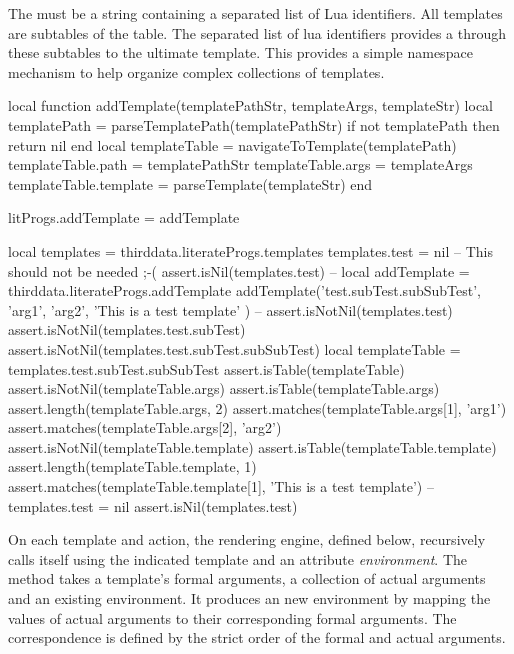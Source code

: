 {{The  must be a string containing a  separated 
list of Lua identifiers. All templates are subtables of the 
 table. The  separated 
list of lua identifiers provides a  through these subtables to 
the ultimate template. This provides a simple namespace mechanism to help 
organize complex collections of templates. 

\startLuaCode
local function addTemplate(templatePathStr, templateArgs, templateStr)
  local templatePath = parseTemplatePath(templatePathStr)
  if not templatePath then return nil end
  local templateTable    = navigateToTemplate(templatePath)
  templateTable.path     = templatePathStr
  templateTable.args     = templateArgs
  templateTable.template = parseTemplate(templateStr)
end

litProgs.addTemplate = addTemplate
\stopLuaCode

\startLuaTest
local templates = thirddata.literateProgs.templates
templates.test = nil -- This should not be needed ;-(
assert.isNil(templates.test)
--
local addTemplate = thirddata.literateProgs.addTemplate
addTemplate('test.subTest.subSubTest',
  { 'arg1', 'arg2'},
  'This is a test template'
)
--
assert.isNotNil(templates.test)
assert.isNotNil(templates.test.subTest)
assert.isNotNil(templates.test.subTest.subSubTest)
local templateTable = templates.test.subTest.subSubTest
assert.isTable(templateTable)
assert.isNotNil(templateTable.args)
assert.isTable(templateTable.args)
assert.length(templateTable.args, 2)
assert.matches(templateTable.args[1], 'arg1')
assert.matches(templateTable.args[2], 'arg2')
assert.isNotNil(templateTable.template)
assert.isTable(templateTable.template)
assert.length(templateTable.template, 1)
assert.matches(templateTable.template[1], 'This is a test template')
--
templates.test = nil
assert.isNil(templates.test)
\stopLuaTest
\stopTestCase
\stopTestSuite

\startTestSuite[buildNewEnv]

On each template  and  action, the 
 rendering engine, defined below, recursively calls itself 
using the indicated template and an attribute \emph{environment}. The 
 method takes a template's formal arguments, a 
collection of actual arguments and an existing environment. It produces an 
new environment by mapping the values of actual arguments to their 
corresponding formal arguments. The correspondence is defined by the 
strict order of the formal and actual arguments. 

}}
